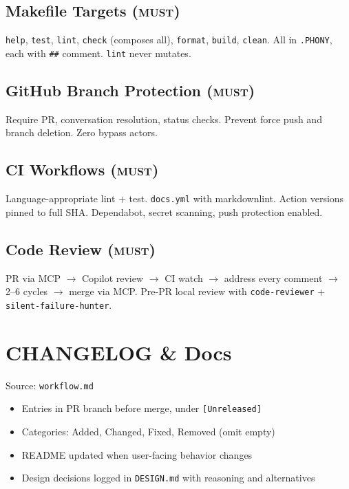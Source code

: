 \documentclass[a4paper,10pt]{article}
\newcommand{\must}{\textsc{must}}
\begin{document}
\subsection{Makefile Targets (\must)}
\texttt{help}, \texttt{test}, \texttt{lint}, \texttt{check} (composes all),
\texttt{format}, \texttt{build}, \texttt{clean}. All in \texttt{.PHONY},
each with \texttt{\#\#} comment. \texttt{lint} never mutates.

\subsection{GitHub Branch Protection (\must)}
Require PR, conversation resolution, status checks. Prevent force push
and branch deletion. Zero bypass actors.

\subsection{CI Workflows (\must)}
Language-appropriate lint + test. \texttt{docs.yml} with markdownlint.
Action versions pinned to full SHA. Dependabot, secret scanning, push
protection enabled.

\subsection{Code Review (\must)}
PR via MCP $\to$ Copilot review $\to$ CI watch $\to$ address every comment
$\to$ 2--6 cycles $\to$ merge via MCP. Pre-PR local review with
\texttt{code-reviewer} + \texttt{silent-failure-hunter}.

\section{CHANGELOG \& Docs}
\label{sec:changelog}
Source: \texttt{workflow.md}

\begin{itemize}
  \item Entries in PR branch before merge, under \texttt{[Unreleased]}
  \item Categories: Added, Changed, Fixed, Removed (omit empty)
  \item README updated when user-facing behavior changes
  \item Design decisions logged in \texttt{DESIGN.md} with reasoning and alternatives
\end{itemize}

\end{document}
